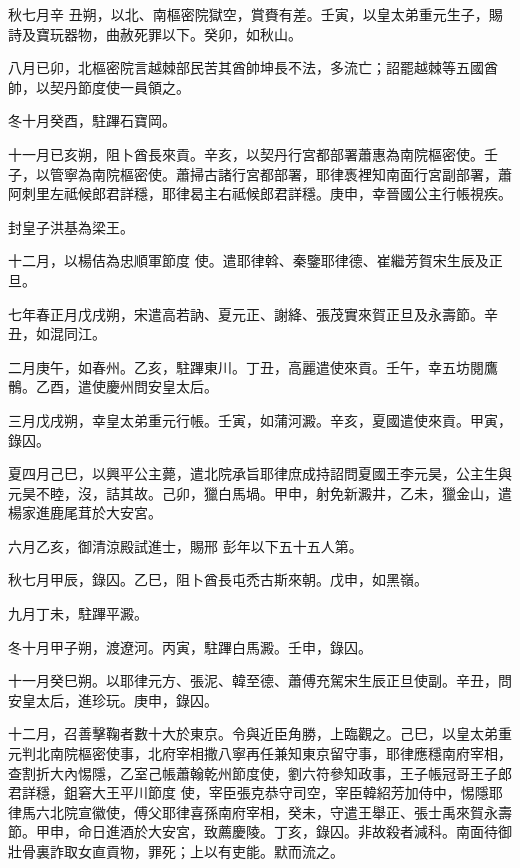 \begin{pinyinscope}
 秋七月辛
 丑朔，以北、南樞密院獄空，賞賚有差。壬寅，以皇太弟重元生子，賜詩及寶玩器物，曲赦死罪以下。癸卯，如秋山。



 八月已卯，北樞密院言越棘部民苦其酋帥坤長不法，多流亡；詔罷越棘等五國酋帥，以契丹節度使一員領之。



 冬十月癸酉，駐蹕石寶岡。



 十一月已亥朔，阻卜酋長來貢。辛亥，以契丹行宮都部署蕭惠為南院樞密使。壬子，以管寧為南院樞密使。蕭掃古諸行宮都部署，耶律褭裡知南面行宮副部署，蕭阿刺里左祗候郎君詳穩，耶律曷主右祗候郎君詳穩。庚申，幸晉國公主行帳視疾。



 封皇子洪基為梁王。



 十二月，以楊佶為忠順軍節度
 使。遣耶律斡、秦鑒耶律德、崔繼芳賀宋生辰及正旦。



 七年春正月戊戌朔，宋遣高若訥、夏元正、謝絳、張茂實來賀正旦及永壽節。辛丑，如混同江。



 二月庚午，如春州。乙亥，駐蹕東川。丁丑，高麗遣使來貢。壬午，幸五坊閱鷹鶻。乙酉，遣使慶州問安皇太后。



 三月戊戌朔，幸皇太弟重元行帳。壬寅，如蒲河澱。辛亥，夏國遣使來貢。甲寅，錄囚。



 夏四月己巳，以興平公主薨，遣北院承旨耶律庶成持詔問夏國王李元昊，公主生與元昊不睦，沒，詰其故。己卯，獵白馬堝。甲申，射免新澱井，乙未，獵金山，遣楊家進鹿尾茸於大安宮。



 六月乙亥，御清涼殿試進士，賜邢
 彭年以下五十五人第。



 秋七月甲辰，錄囚。乙巳，阻卜酋長屯禿古斯來朝。戊申，如黑嶺。



 九月丁未，駐蹕平澱。



 冬十月甲子朔，渡遼河。丙寅，駐蹕白馬澱。壬申，錄囚。



 十一月癸巳朔。以耶律元方、張泥、韓至德、蕭傅充駕宋生辰正旦使副。辛丑，問安皇太后，進珍玩。庚申，錄囚。



 十二月，召善擊鞠者數十大於東京。令與近臣角勝，上臨觀之。己巳，以皇太弟重元判北南院樞密使事，北府宰相撒八寧再任兼知東京留守事，耶律應穩南府宰相，查割折大內惕隱，乙室己帳蕭翰乾州節度使，劉六符參知政事，王子帳冠哥王子郎君詳穩，鉏窘大王平川節度
 使，宰臣張克恭守司空，宰臣韓紹芳加侍中，惕隱耶律馬六北院宣徽使，傅父耶律喜孫南府宰相，癸未，守遣王舉正、張士禹來賀永壽節。甲申，命日進酒於大安宮，致薦慶陵。丁亥，錄囚。非故殺者減科。南面待御壯骨裏詐取女直貢物，罪死；上以有吏能。默而流之。




\end{pinyinscope}

